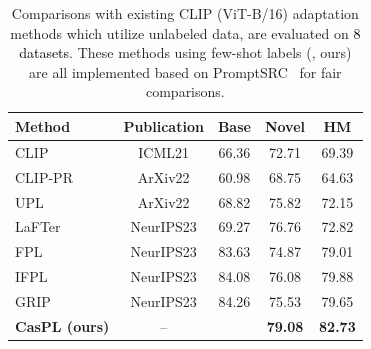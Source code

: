 \documentclass[runningheads]{llncs}
\newcommand{\rewrite}[1]{\textcolor{black}{#1}}%
\begin{document}
{{\begin{table}[t]
    \centering
    \caption{Comparisons with existing CLIP (ViT-B/16) adaptation methods which utilize unlabeled data, are evaluated on \rewrite{8 datasets}. These methods using few-shot labels (\cite{menghini2023enhancing}, ours) are all implemented based on PromptSRC~\cite{khattak2023self} for fair comparisons.  %
    }
    \setlength{\tabcolsep}{10pt}
    \resizebox{0.7\linewidth}{!}
    {
        \begin{tabular}{l|c|ccc}
        \hline
        Method                                 & Publication    & Base   & Novel   & HM \\
        \hline
        CLIP~\cite{radford2021learning}        & ICML21          & 66.36  & 72.71   & 69.39   \\
        \hline
        CLIP-PR~\cite{kahana2022improving}     & ArXiv22         & 60.98  & 68.75   & 64.63 \\
        UPL~\cite{huang2022unsupervised}       & ArXiv22         & 68.82  & 75.82   & 72.15   \\
        LaFTer~\cite{mirza2023lafter}          & NeurIPS23       & 69.27  & 76.76   & 72.82   \\
        \hline
        FPL~\cite{menghini2023enhancing}       & NeurIPS23       & 83.63  &  74.87  & 79.01\\
        IFPL~\cite{menghini2023enhancing}      & NeurIPS23       & 84.08  &  76.08  & 79.88  \\
        GRIP~\cite{menghini2023enhancing}      & NeurIPS23       & 84.26  &  75.53  & 79.65  \\ 
        \textbf{CasPL (ours)  }                & --               &  \cellcolor{tablecolor}{\textbf{86.73}}  &  \cellcolor{tablecolor}\textbf{79.08}  & \cellcolor{tablecolor}\textbf{82.73}  \\ 
        \hline
        \end{tabular}
    }
    \label{table:weakly}
\end{table}


}}
\end{document}
